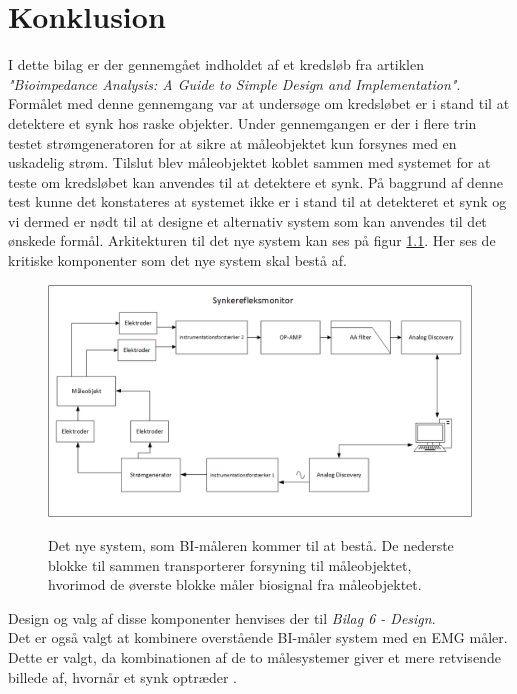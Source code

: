  



\chapter{Konklusion}

I dette bilag er der gennemgået indholdet af et kredsløb fra artiklen \textit{"Bioimpedance Analysis: A Guide to Simple Design and Implementation"}. Formålet med denne gennemgang var at undersøge om kredsløbet er i stand til at detektere et synk hos raske objekter. Under gennemgangen er der i flere trin testet strømgeneratoren for at sikre at måleobjektet kun forsynes med en uskadelig strøm. Tilslut blev måleobjektet koblet sammen med systemet for at teste om kredsløbet kan anvendes til at detektere et synk. På baggrund af denne test kunne det konstateres at systemet ikke er i stand til at detekteret et synk og vi dermed er nødt til at designe et alternativ system som kan anvendes til det ønskede formål. Arkitekturen til det nye system kan ses på figur \ref{fig:konklusiondiagram}. Her ses de kritiske komponenter som det nye system skal bestå af.

\begin{figure}[H]
\centering
{\includegraphics[width=\linewidth]
{Figure/konklusiondiagram}}
\caption{Det nye system, som BI-måleren kommer til at bestå. De nederste blokke til sammen transporterer forsyning til måleobjektet, hvorimod de øverste blokke måler biosignal fra måleobjektet. }
\label{fig:konklusiondiagram}
\end{figure}

Design og valg af disse komponenter henvises der til \textit{Bilag 6 - Design}. \\
Det er også valgt at kombinere overstående BI-måler system med en EMG måler. Dette er valgt, da kombinationen af de to målesystemer giver et mere retvisende billede af, hvornår et synk optræder \cite{Schultheiss2014}    \citep{ChristensenElisabeth;LundbakStrand2017}. 


